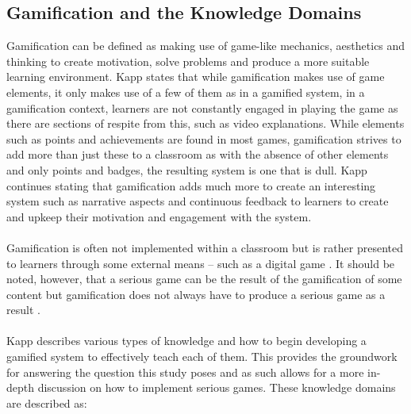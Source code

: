 \documentclass[conference]{IEEEtran}
\begin{document}
\subsection{Gamification and the Knowledge Domains}
Gamification can be defined as making use of game-like mechanics, aesthetics and thinking to create motivation, solve problems and produce a more suitable learning environment\cite{Kapp2012a}. Kapp\cite{KappArticle2012} states that while gamification makes use of game elements, it only makes use of a few of them as in a gamified system, in a gamification context, learners are not constantly engaged in playing the game as there are sections of respite from this, such as video explanations. While elements such as points and achievements are found in most games, gamification strives to add more than just these to a classroom as with the absence of other elements and only points and badges, the resulting system is one that is dull\cite{KappArticle2012}. Kapp\cite{KappArticle2012} continues stating that gamification adds much more to create an interesting system such as narrative aspects and continuous feedback to learners to create and upkeep their motivation and engagement with the system.
\\\\
Gamification is often not implemented within a classroom but is rather presented to learners through some external means – such as a digital game \cite{KappArticle2012}. It should be noted, however, that a serious game can be the result of the gamification of some content but gamification does not always have to produce a serious game as a result \cite{KappArticle2012}.  
\\\\
Kapp\cite{Kapp2012a} describes various types of knowledge and how to begin developing a gamified system to effectively teach each of them. This provides the groundwork for answering the question this study poses and as such allows for a more in-depth discussion on how to implement serious games. These knowledge domains are described as\cite{Kapp2012a}:
\end{document}
